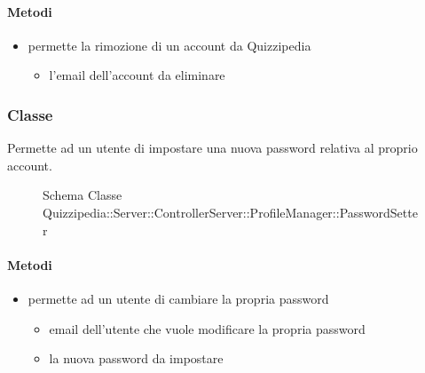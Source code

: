 \paragraph{Metodi}
\begin{itemize}
\item {}
\newline
permette la rimozione di un account da Quizzipedia
\newline
{}
\newline
\begin{itemize}
\item {}
\newline
l'email dell'account da eliminare
\end{itemize}
\end{itemize}
\subsubsection{Classe }
Permette ad un utente di impostare una nuova password relativa al proprio account.
\begin{figure}[H]
\centering
\noindent{}
\caption[Schema Classe PasswordSetter]{Schema Classe Quizzipedia::Server::ControllerServer::ProfileManager::PasswordSetter}
\end{figure}
\paragraph{Metodi}
\begin{itemize}
\item {}
\newline
permette ad un utente di cambiare la propria password
\newline
{}
\newline
\begin{itemize}
\item {}
\newline
email dell'utente che vuole modificare la propria password
\item {}
\newline
la nuova password da impostare
\end{itemize}
\end{itemize}
